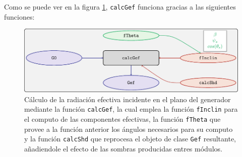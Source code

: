 Como se puede ver en la figura \ref{fig:calcgef}, \texttt{calcGef} funciona gracias a las siguientes funciones:
\begin{figure}[htbp]
\centering
\includegraphics[keepaspectratio,width=\textwidth,height=0.5\textheight]{figuras/calcgef.pdf}
\caption{Cálculo de la radiación efectiva incidente en el plano del generador mediante la función \texttt{calcGef}, la cual emplea la función \texttt{fInclin} para el computo de las componentes efectivas, la función \texttt{fTheta} que provee a la función anterior los ángulos necesarios para su computo y la función \texttt{calcShd} que reprocesa el objeto de clase \texttt{Gef} resultante, añadiendole el efecto de las sombras producidas entres módulos. \label{fig:calcgef}}
\end{figure}

